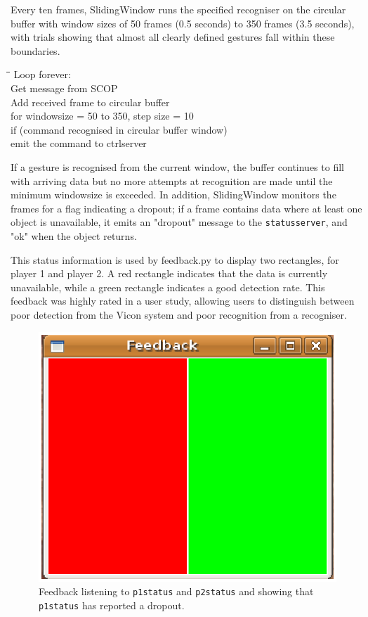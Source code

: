 \documentclass[12pt,a4,notitlepage]{report}
\renewcommand{\_}{\texttt{\symbol{95}}}
\newcommand{\<}{\texttt{\symbol{60}}}
\renewcommand{\>}{\texttt{\symbol{62}}}
\newcommand{\scopendpoint}[1]{\texttt{#1}}
\newcommand{\variable}[1]{\texttt{#1}}
\newenvironment{pseudocode}{\begin{slshape}\begin{tabbing}\hspace*{0.5cm}\=\hspace*{0.5cm}\=\hspace*{0.5cm}\= \kill }{\end{tabbing}\end{slshape}}
\begin{document}
Every ten frames, SlidingWindow runs the specified recogniser on the circular buffer with window sizes of 50 frames (0.5 seconds) to 350 frames (3.5 seconds), with trials showing that almost all clearly defined gestures fall within these boundaries.

\begin{pseudocode}
Loop forever: \\
\>	Get message from SCOP \\
\>	Add received frame to circular buffer \\
\>\>    for windowsize = 50 to 350, step size = 10 \\
\>\>        if (command recognised in circular buffer window) \\
\>\>\>           emit the command to ctrlserver
\end{pseudocode}

If a gesture is recognised from the current window, the buffer continues to fill with arriving data but no more attempts at recognition are made until the minimum windowsize is exceeded. In addition, SlidingWindow monitors the frames for a flag indicating a dropout; if a frame contains data where at least one object is unavailable, it emits an "dropout" message to the \variable{statusserver}, and "ok" when the object returns.

This status information is used by feedback.py to display two rectangles, for player 1 and player 2. A red rectangle indicates that the data is currently unavailable, while a green rectangle indicates a good detection rate. This feedback was highly rated in a user study, allowing users to distinguish between poor detection from the Vicon system and poor recognition from a recogniser.

\begin{figure}
\centering
\includegraphics[scale=0.4,angle=0]{images/feedback.ps}
\caption{Feedback listening to \scopendpoint{p1status} and \scopendpoint{p2status} and showing that \scopendpoint{p1status} has reported a dropout.}
\label{feedback}
\end{figure}
\end{document}
